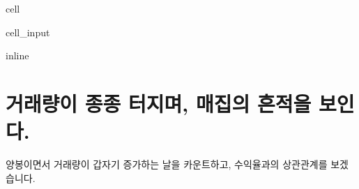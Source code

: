 \documentclass[letterpaper,10pt,english]{jupyterBook}
\begin{document}
\begin{sphinxuseclass}{cell}\begin{sphinxVerbatimInput}

\begin{sphinxuseclass}{cell_input}
\begin{sphinxVerbatim}[commandchars=\\\{\}]
   
 inline
   
   
   
  
\end{sphinxVerbatim}

\end{sphinxuseclass}\end{sphinxVerbatimInput}

\end{sphinxuseclass}

\part{거래량이 종종 터지며, 매집의 흔적을 보인다.}
\label{\detokenize{chapter5/5.1.4_Hypothesis_4:id1}}\label{\detokenize{chapter5/5.1.4_Hypothesis_4::doc}}
\sphinxAtStartPar
양봉이면서 거래량이 갑자기 증가하는 날을 카운트하고, 수익율과의 상관관계를 보겠습니다.
\end{document}
